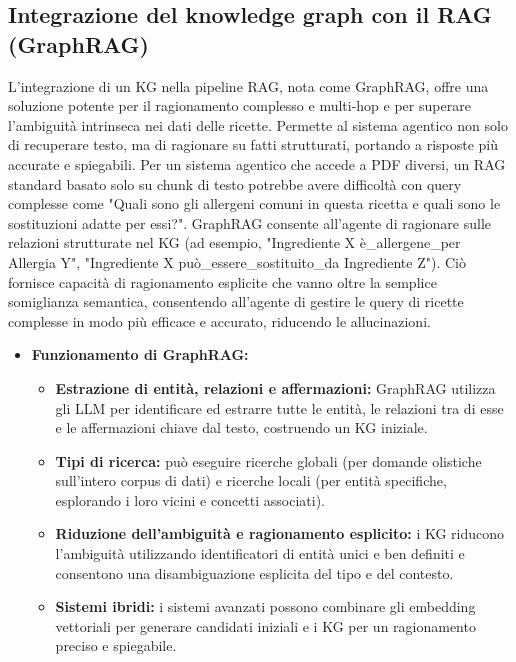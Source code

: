 \documentclass[a4paper, 11pt]{article}
\begin{document}
\subsection{Integrazione del knowledge graph con il RAG (GraphRAG)}
L'integrazione di un KG nella pipeline RAG, nota come GraphRAG, offre una soluzione potente per il ragionamento complesso e multi-hop e per superare l'ambiguità intrinseca nei dati delle ricette. \cite{graphrag_explained} Permette al sistema agentico non solo di recuperare testo, ma di ragionare su fatti strutturati, portando a risposte più accurate e spiegabili. Per un sistema agentico che accede a PDF diversi, un RAG standard basato solo su chunk di testo potrebbe avere difficoltà con query complesse come "Quali sono gli allergeni comuni in questa ricetta e quali sono le sostituzioni adatte per essi?". \cite{ingredient_substitutions_kg} GraphRAG consente all'agente di ragionare sulle relazioni strutturate nel KG (ad esempio, "Ingrediente X è\_allergene\_per Allergia Y", "Ingrediente X può\_essere\_sostituito\_da Ingrediente Z"). Ciò fornisce capacità di ragionamento esplicite che vanno oltre la semplice somiglianza semantica, consentendo all'agente di gestire le query di ricette complesse in modo più efficace e accurato, riducendo le allucinazioni. \cite{kg_beyond_retrieval}
\begin{itemize}
    \item \textbf{Funzionamento di GraphRAG:}
    \begin{itemize}
        \item \textbf{Estrazione di entità, relazioni e affermazioni:} GraphRAG utilizza gli LLM per identificare ed estrarre tutte le entità, le relazioni tra di esse e le affermazioni chiave dal testo, costruendo un KG iniziale. \cite{graphrag_explained}
        \item \textbf{Tipi di ricerca:} può eseguire ricerche globali (per domande olistiche sull'intero corpus di dati) e ricerche locali (per entità specifiche, esplorando i loro vicini e concetti associati). \cite{graphrag_explained}
        \item \textbf{Riduzione dell'ambiguità e ragionamento esplicito:} i KG riducono l'ambiguità utilizzando identificatori di entità unici e ben definiti e consentono una disambiguazione esplicita del tipo e del contesto. \cite{what_is_entity_linking_ontotext}
        \item \textbf{Sistemi ibridi:} i sistemi avanzati possono combinare gli embedding vettoriali per generare candidati iniziali e i KG per un ragionamento preciso e spiegabile. \cite{kg_beyond_retrieval}
    \end{itemize}
\end{itemize}
\end{document}
